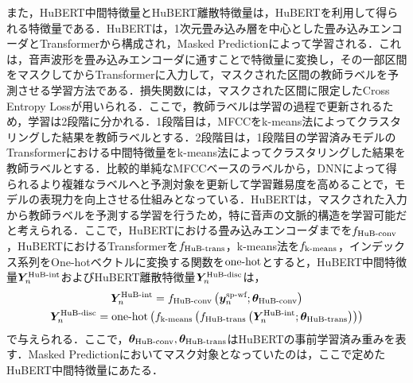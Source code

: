 また，HuBERT中間特徴量とHuBERT離散特徴量は，HuBERTを利用して得られる特徴量である．HuBERTは，1次元畳み込み層を中心とした畳み込みエンコーダとTransformerから構成され，Masked Predictionによって学習される．これは，音声波形を畳み込みエンコーダに通すことで特徴量に変換し，その一部区間をマスクしてからTransformerに入力して，マスクされた区間の教師ラベルを予測させる学習方法である．損失関数には，マスクされた区間に限定したCross Entropy Lossが用いられる．ここで，教師ラベルは学習の過程で更新されるため，学習は2段階に分かれる．1段階目は，MFCCをk-means法によってクラスタリングした結果を教師ラベルとする．2段階目は，1段階目の学習済みモデルのTransformerにおける中間特徴量をk-means法によってクラスタリングした結果を教師ラベルとする．比較的単純なMFCCベースのラベルから，DNNによって得られるより複雑なラベルへと予測対象を更新して学習難易度を高めることで，モデルの表現力を向上させる仕組みとなっている．HuBERTは，マスクされた入力から教師ラベルを予測する学習を行うため，特に音声の文脈的構造を学習可能だと考えられる．ここで，HuBERTにおける畳み込みエンコーダまでを$f_{\text{HuB-conv}}$，HuBERTにおけるTransformerを$f_{\text{HuB-trans}}$，k-means法を$f_{\text{k-means}}$，インデックス系列をOne-hotベクトルに変換する関数を$\text{one-hot}$とすると，HuBERT中間特徴量$\bm{Y}^{\text{HuB-int}}_{n}$およびHuBERT離散特徴量$\bm{Y}^{\text{HuB-disc}}_{n}$は，
\begin{gather}
    \bm{Y}^{\text{HuB-int}}_{n} = f_{\text{HuB-conv}}\left(\bm{y}^{\text{sp-wf}}_{n}; \bm{\theta}_{\text{HuB-conv}}\right) \\
    \bm{Y}^{\text{HuB-disc}}_{n} = \text{one-hot}\left(f_{\text{k-means}}\left(f_{\text{HuB-trans}}\left(\bm{Y}^{\text{HuB-int}}_{n}; \bm{\theta}_{\text{HuB-trans}}\right)\right)\right)
\end{gather}
で与えられる．ここで，$\bm{\theta}_{\text{HuB-conv}}, \bm{\theta}_{\text{HuB-trans}}$はHuBERTの事前学習済み重みを表す．Masked Predictionにおいてマスク対象となっていたのは，ここで定めたHuBERT中間特徴量にあたる．


